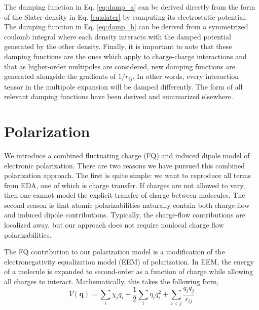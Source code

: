 \documentclass[journal=jacsat,manuscript=article]{achemso}
\begin{document}
The damping function in Eq. \ref{eq:damp_a} can be derived directly from the form
of the Slater density in Eq. \ref{eq:slater} by computing its electrostatic potential.
The damping function in Eq. \ref{eq:damp_b} can be derived from a symmetrized coulomb integral where each
density interacts with the damped potential generated by the other density.\cite{rackers2021polarizable}
Finally, it is important to note that these damping functions are the ones which apply
to charge-charge interactions and that as higher-order multipoles are considered, new damping
functions are generated alongside the gradients of $1/r_{ij}$. In other words, every interaction
tensor in the multipole expansion will be damped differently. The form of all relevant damping
functions have been derived and summarized elsewhere.\cite{rackers2021polarizable}

\section*{Polarization}

We introduce a combined fluctuating charge (FQ) and induced dipole model of electronic
polarization. There are two reasons we have pursued this combined polarization
approach. The first is quite simple: we want to reproduce all terms from EDA,
one of which is charge transfer. If charges are not allowed to vary, then one
cannot model the explicit transfer of charge between molecules. The second reason is
that atomic polarizabilities naturally contain both charge-flow and induced dipole
contributions.\cite{stone1985distributedb} Typically, the charge-flow contributions
are localized away\cite{ruth1994localization}, but our approach does not require nonlocal
charge flow polarizabilities.

The FQ contribution to our polarization model is a modification of the electronegativity
equalization model (EEM) of polarization.\cite{mortier1986electronegativity} In EEM,
the energy of a molecule is expanded to second-order as a function of charge while allowing
all charges to interact. Mathematically, this takes the following form,
\begin{equation}
  V(\bm{q})=\sum_i \chi_i q_i + \frac12 \sum_i \eta_i q_i^2 + \sum_{i<j} \frac{q_i q_j}{r_{ij}}
  \label{eq:eem}
\end{equation}
\end{document}
